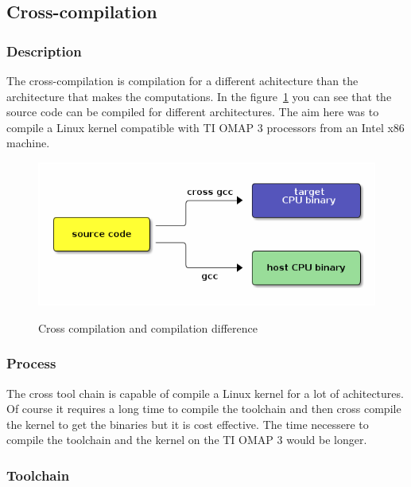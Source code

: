 	\subsection{Cross-compilation}
	\subsubsection{Description}
	\par The cross-compilation is compilation for a different achitecture than the architecture that makes the computations. In the figure~\ref{cross} you can see that the source code can be compiled for different architectures. The aim here was to compile a Linux kernel compatible with TI OMAP 3 processors from an Intel x86 machine.
	\begin{figure}[h]
		\begin{center}
			\includegraphics[scale=0.5]{images_not_compressed/cross-compile.png}
			\label{cross}
			\caption{Cross compilation and compilation difference}
		\end{center}
	\end{figure}

	\subsubsection{Process}
	\par The cross tool chain is capable of compile a Linux kernel for a lot of achitectures. Of course it requires a long time to compile the toolchain and then cross compile the kernel to get the binaries but it is cost effective. The time necessere to compile the toolchain and the kernel on the TI OMAP 3 would be longer.
	
	\subsubsection{Toolchain}
	
